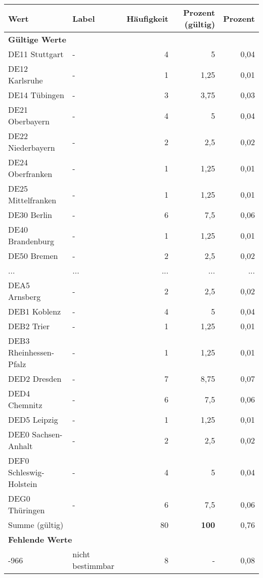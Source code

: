      \begin{longtable}{Xlrrr}
     \toprule
     \textbf{Wert} & \textbf{Label} & \textbf{Häufigkeit} & \textbf{Prozent (gültig)} & \textbf{Prozent} \\
     \endhead
     \midrule
     \multicolumn{5}{l}{\textbf{Gültige Werte}}\\
        \multicolumn{1}{X}{DE11 Stuttgart} & - & 4 & 5 & 0,04 \\
        \multicolumn{1}{X}{DE12 Karlsruhe} & - & 1 & 1,25 & 0,01 \\
        \multicolumn{1}{X}{DE14 Tübingen} & - & 3 & 3,75 & 0,03 \\
        \multicolumn{1}{X}{DE21 Oberbayern} & - & 4 & 5 & 0,04 \\
        \multicolumn{1}{X}{DE22 Niederbayern} & - & 2 & 2,5 & 0,02 \\
        \multicolumn{1}{X}{DE24 Oberfranken} & - & 1 & 1,25 & 0,01 \\
        \multicolumn{1}{X}{DE25 Mittelfranken} & - & 1 & 1,25 & 0,01 \\
        \multicolumn{1}{X}{DE30 Berlin} & - & 6 & 7,5 & 0,06 \\
        \multicolumn{1}{X}{DE40 Brandenburg} & - & 1 & 1,25 & 0,01 \\
        \multicolumn{1}{X}{DE50 Bremen} & - & 2 & 2,5 & 0,02 \\
       ... & ... & ... & ... & ... \\
        \multicolumn{1}{X}{DEA5 Arnsberg} & - & 2 & 2,5 & 0,02 \\
        \multicolumn{1}{X}{DEB1 Koblenz} & - & 4 & 5 & 0,04 \\
        \multicolumn{1}{X}{DEB2 Trier} & - & 1 & 1,25 & 0,01 \\
        \multicolumn{1}{X}{DEB3 Rheinhessen-Pfalz} & - & 1 & 1,25 & 0,01 \\
        \multicolumn{1}{X}{DED2 Dresden} & - & 7 & 8,75 & 0,07 \\
        \multicolumn{1}{X}{DED4 Chemnitz} & - & 6 & 7,5 & 0,06 \\
        \multicolumn{1}{X}{DED5 Leipzig} & - & 1 & 1,25 & 0,01 \\
        \multicolumn{1}{X}{DEE0 Sachsen-Anhalt} & - & 2 & 2,5 & 0,02 \\
        \multicolumn{1}{X}{DEF0 Schleswig-Holstein} & - & 4 & 5 & 0,04 \\
        \multicolumn{1}{X}{DEG0 Thüringen} & - & 6 & 7,5 & 0,06 \\
     \midrule
      \multicolumn{2}{l}{Summe (gültig)} & 80 &
      \textbf{100} &
         0,76 \\
     \multicolumn{5}{l}{\textbf{Fehlende Werte}}\\
       -966 & nicht bestimmbar & 8 & - & 0,08 \\


\end{longtable}

